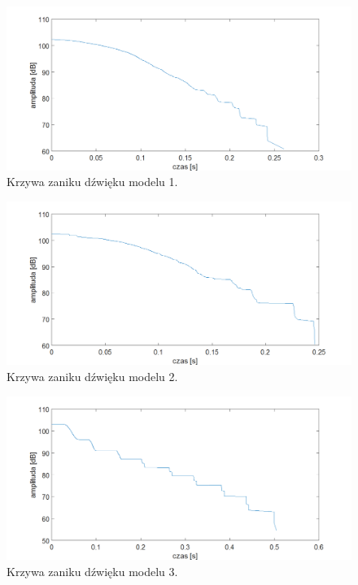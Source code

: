 \begin{figure}[H]
        \centering
                \centering
                \includegraphics[width=16cm]{zanik1}
	\caption{Krzywa zaniku dźwięku modelu 1.}
\end{figure}

\begin{figure}[H]
        \centering
                \centering
                \includegraphics[width=16cm]{zanik2}
	\caption{Krzywa zaniku dźwięku modelu 2.}
\end{figure}

\begin{figure}[H]
        \centering
                \centering
                \includegraphics[width=16cm]{zanik3}
	\caption{Krzywa zaniku dźwięku modelu 3.}
\end{figure}


